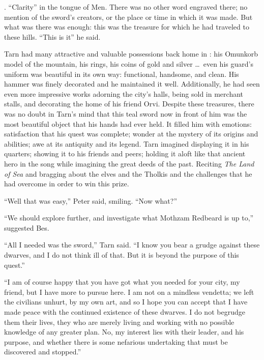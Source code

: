 
\emph{\kildir}.  ``Clarity'' in the tongue of Men.  There was no other word engraved there; no mention of the sword's creators, or the place or time in which it was made.  But what was there was enough: this was the treasure for which he had traveled to these hills.  ``This is it'' he said.

Tarn had many attractive and valuable possessions back home in \korbarthrond: his Omunkorb model of the mountain, his rings, his coins of gold and silver \ldots\ even his guard's uniform was beautiful in its own way: functional, handsome, and clean.  His hammer was finely decorated and he maintained it well.  Additionally, he had seen even more impressive works adorning the city's halls, being sold in merchant stalls, and decorating the home of his friend Orvi.  Despite these treasures, there was no doubt in Tarn's mind that this teal sword now in front of him was the most beautiful object that his hands had ever held.  It filled him with emotions: satisfaction that his quest was complete; wonder at the mystery of its origins and abilities; awe at its antiquity and its legend.  Tarn imagined displaying it in his quarters; showing it to his friends and peers; holding it aloft like that ancient hero in the song while imagining the great deeds of the past.  Reciting \emph{The Land of Sea} and bragging about the elves and the Tholkis and the challenges that he had overcome in order to win this prize.

``Well that was easy,'' Peter said, smiling.  ``Now what?''

``We should explore further, and investigate what Mothzam Redbeard is up to,'' suggested Bes.

``All I needed was the sword,'' Tarn said.  ``I know you bear a grudge against these dwarves, and I do not think ill of that.  But it is beyond the purpose of this quest.''

``I am of course happy that you have got what you needed for your city, my friend, but I have more to pursue here.  I am not on a mindless vendetta; we left the civilians unhurt, by my own art, and so I hope you can accept that I have made peace with the continued existence of these dwarves.  I do not begrudge them their lives, they who are merely living and working with no possible knowledge of any greater plan.  No, my interest lies with their leader, and his purpose, and whether there is some nefarious undertaking that must be discovered and stopped.''

